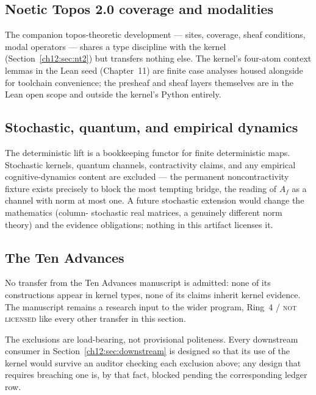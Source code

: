 \subsection{Noetic Topos 2.0 coverage and modalities}

The companion topos-theoretic development --- sites, coverage, sheaf
conditions, modal operators --- shares a type discipline with the kernel
(Section~\ref{ch12:sec:nt2}) but transfers nothing else. The kernel's
four-atom context lemmas in the Lean seed (Chapter~11) are finite case
analyses housed alongside for toolchain convenience; the presheaf and
sheaf layers themselves are in the Lean open scope and outside the
kernel's Python entirely.

\subsection{Stochastic, quantum, and empirical dynamics}

The deterministic lift is a bookkeeping functor for finite deterministic
maps. Stochastic kernels, quantum channels, contractivity claims, and
any empirical cognitive-dynamics content are excluded --- the permanent
noncontractivity fixture exists precisely to block the most tempting
bridge, the reading of $A_f$ as a channel with norm at most one. A
future stochastic extension would change the mathematics (column-
stochastic real matrices, a genuinely different norm theory) and the
evidence obligations; nothing in this artifact licenses it.

\subsection{The Ten Advances}

No transfer from the Ten Advances manuscript is admitted: none of its
constructions appear in kernel types, none of its claims inherit kernel
evidence. The manuscript remains a research input to the wider program,
Ring~4 / \textsc{not licensed} like every other transfer in this
section.

\begin{boundary}\label{ch12:bdy:excluded}
The exclusions are load-bearing, not provisional politeness. Every
downstream consumer in Section~\ref{ch12:sec:downstream} is designed
so that its use of the kernel would survive an auditor checking each
exclusion above; any design that requires breaching one is, by that
fact, blocked pending the corresponding ledger row.
\end{boundary}

